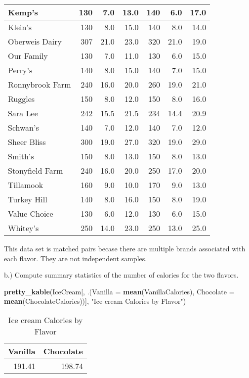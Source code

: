 \documentclass[
  12pt,
]{report}
\newenvironment{Shaded}{\begin{snugshade}}{\end{snugshade}}
\newcommand{\DataTypeTok}[1]{\textcolor[rgb]{0.13,0.29,0.53}{#1}}
\newcommand{\KeywordTok}[1]{\textcolor[rgb]{0.13,0.29,0.53}{\textbf{#1}}}
\newcommand{\NormalTok}[1]{#1}
\newcommand{\StringTok}[1]{\textcolor[rgb]{0.31,0.60,0.02}{#1}}
\begin{document}
\begin{table}[!h]
\begin{tabular}[t]{l|r|r|r|r|r|r}
\hline
Kemp's & 130 & 7.0 & 13.0 & 140 & 6.0 & 17.0\\
\hline
Klein's & 130 & 8.0 & 15.0 & 140 & 8.0 & 14.0\\
\hline
Oberweis Dairy & 307 & 21.0 & 23.0 & 320 & 21.0 & 19.0\\
\hline
Our Family & 130 & 7.0 & 11.0 & 130 & 6.0 & 15.0\\
\hline
Perry's & 140 & 8.0 & 15.0 & 140 & 7.0 & 15.0\\
\hline
Ronnybrook Farm & 240 & 16.0 & 20.0 & 260 & 19.0 & 21.0\\
\hline
Ruggles & 150 & 8.0 & 12.0 & 150 & 8.0 & 16.0\\
\hline
Sara Lee & 242 & 15.5 & 21.5 & 234 & 14.4 & 20.9\\
\hline
Schwan's & 140 & 7.0 & 12.0 & 140 & 7.0 & 12.0\\
\hline
Sheer Bliss & 300 & 19.0 & 27.0 & 320 & 19.0 & 29.0\\
\hline
Smith's & 150 & 8.0 & 13.0 & 150 & 8.0 & 13.0\\
\hline
Stonyfield Farm & 240 & 16.0 & 20.0 & 250 & 17.0 & 20.0\\
\hline
Tillamook & 160 & 9.0 & 10.0 & 170 & 9.0 & 13.0\\
\hline
Turkey Hill & 140 & 8.0 & 16.0 & 150 & 8.0 & 19.0\\
\hline
Value Choice & 130 & 6.0 & 12.0 & 130 & 6.0 & 15.0\\
\hline
Whitey's & 250 & 14.0 & 23.0 & 250 & 13.0 & 25.0\\
\hline
\end{tabular}
\end{table}

This data set is matched pairs becase there are multiple brands
associated with each flavor. They are not independent samples.

b.) Compute summary statistics of the number of calories for the two
flavors.

\begin{Shaded}
\begin{Highlighting}[]
\KeywordTok{pretty_kable}\NormalTok{(IceCream[, .(}\DataTypeTok{Vanilla =} \KeywordTok{mean}\NormalTok{(VanillaCalories), }\DataTypeTok{Chocolate =} \KeywordTok{mean}\NormalTok{(ChocolateCalories))], }
             \StringTok{"Ice cream Calories by Flavor"}\NormalTok{)}
\end{Highlighting}
\end{Shaded}

\begin{table}[!h]

\caption{\label{tab:unnamed-chunk-28}Ice cream Calories by Flavor}
\centering
\begin{tabular}[t]{r|r}
\hline
Vanilla & Chocolate\\
\hline
191.41 & 198.74\\
\hline
\end{tabular}
\end{table}
\end{document}
